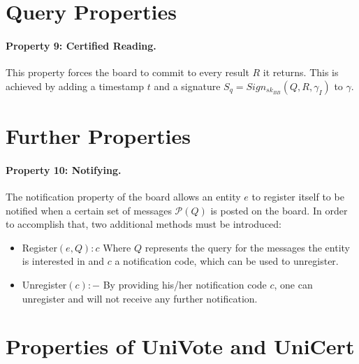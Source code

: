 \documentclass[bibtotoc,halfparskip,oneside]{scrreprt}
\begin{document}
	\section{Query Properties}\label{ub3}
	
	\paragraph*{Property 9: Certified Reading.}
	
	This property forces the board to commit to every result $R$ it returns. This is achieved by adding a timestamp $t$ and a signature $S_q=Sign_{sk_{BB}}(Q, R, \gamma_I)$ to $\gamma$.
	
	\section{Further Properties}
	
	\paragraph*{Property 10: Notifying.}
	
	The notification property of the board allows an entity  $e$ to register itself to be notified when a certain set of messages $\mathcal{P}(Q)$ is posted on the board. In order to accomplish that, two additional methods must be introduced:
	
	\begin{itemize}
		\item Register$(e, Q): c$ \newline Where $Q$ represents the query for the messages the entity is interested in and $c$ a notification code, which can be used to unregister. 
		\item Unregister$(c):-$ \newline By providing his/her notification code $c$, one can unregister and will not receive any further notification.
	\end{itemize}
	
	\section{Properties of UniVote and UniCert}\label{ub4}
	
\end{document}
